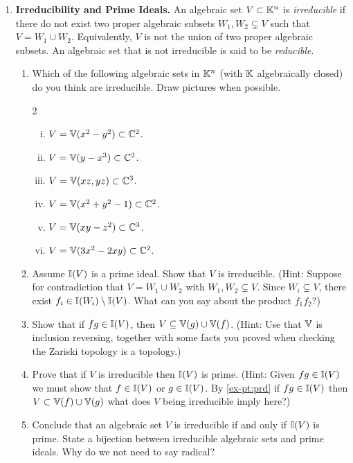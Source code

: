 \documentclass[12pt,reqno]{amsart}
\begin{document}
\begin{enumerate}[leftmargin=*]
\item\label{ex:irred} \textbf{Irreducibility and Prime Ideals.} An algebraic set $V \subset \mathbb{K}^n$ is \emph{irreducible} if there do not exist two proper algebraic subsets $W_1,W_2 \subsetneq V$ such that $V=W_1\cup W_2$. Equivalently, $V$ is not the union of two proper algebraic subsets. An algebraic set that is not irreducible is said to be \emph{reducible}.
\begin{enumerate}[label=(\alph*),ref=\theenumi\alph*]
\item  Which of the following algebraic sets in $\mathbb{K}^n$ (with $\mathbb{K}$ algebraically closed) do you think are irreducible. Draw pictures when possible. 
	\begin{multicols}{2}
	\begin{enumerate}[(i)]
	\item $V=\mathbb{V}(x^2-y^2)\subset \mathbb{C}^2$.
	\item $V=\mathbb{V}(y-x^3)\subset \mathbb{C}^2$.
	\item $V=\mathbb{V}(xz,yz)\subset \mathbb{C}^3$.
	\item $V=\mathbb{V}(x^2+y^2-1)\subset \mathbb{C}^2$.
	\item $V=\mathbb{V}(xy-z^2)\subset \mathbb{C}^3$.
	\item $V=\mathbb{V}(3x^2-2xy) \subset \mathbb{C}^2$.
	\end{enumerate}
	\end{multicols}
\item Assume $\mathbb{I}(V)$ is a prime ideal. Show that $V$ is irreducible. (Hint: Suppose for contradiction that $V=W_1\cup W_2$ with $W_1,W_2\subsetneq V$. Since $W_i\subsetneq V$, there exist $f_i\in \mathbb{I}(W_i)\setminus \mathbb{I}(V)$. What can you say about the product $f_1f_2$?)
\item\label{ex-pt:prd} Show that if $fg\in \mathbb{I}(V)$, then $V \subseteq \mathbb{V}(g) \cup \mathbb{V}(f)$. (Hint: Use that $\mathbb{V}$ is inclusion reversing, together with some facts you proved when checking the Zariski topology is a topology.)
\item Prove that if $V$ is irreducible then $\mathbb{I}(V)$ is prime. (Hint: Given $fg \in \mathbb{I}(V)$ we must show that $f\in \mathbb{I}(V)$ or $g \in \mathbb{I}(V)$. By \ref{ex-pt:prd} if $fg\in \mathbb{I}(V)$ then $V \subset \mathbb{V}(f)\cup \mathbb{V}(g)$ what does $V$ being irreducible imply here?)
\item Conclude that an algebraic set $V$ is irreducible if and only if $\mathbb{I}(V)$ is prime. State a bijection between irreducible algebraic sets and prime ideals. Why do we not need to say radical?
\end{enumerate}



\end{enumerate}
\end{document}
